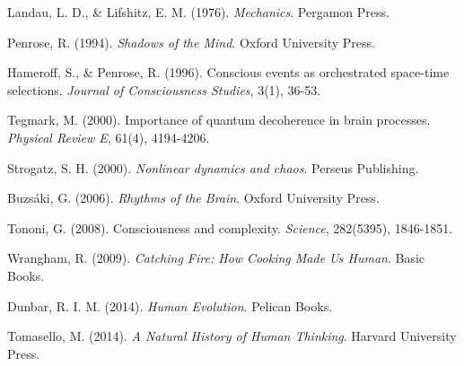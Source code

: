 \documentclass[11pt]{article}
\theoremstyle{remark}
\begin{document}
\begin{thebibliography}{99}

Landau, L. D., \& Lifshitz, E. M. (1976). \textit{Mechanics}. Pergamon Press.

Penrose, R. (1994). \textit{Shadows of the Mind}. Oxford University Press.

Hameroff, S., \& Penrose, R. (1996). Conscious events as orchestrated space-time selections. \textit{Journal of Consciousness Studies}, 3(1), 36-53.

Tegmark, M. (2000). Importance of quantum decoherence in brain processes. \textit{Physical Review E}, 61(4), 4194-4206.

Strogatz, S. H. (2000). \textit{Nonlinear dynamics and chaos}. Perseus Publishing.

Buzsáki, G. (2006). \textit{Rhythms of the Brain}. Oxford University Press.

Tononi, G. (2008). Consciousness and complexity. \textit{Science}, 282(5395), 1846-1851.

Wrangham, R. (2009). \textit{Catching Fire: How Cooking Made Us Human}. Basic Books.

Dunbar, R. I. M. (2014). \textit{Human Evolution}. Pelican Books.

Tomasello, M. (2014). \textit{A Natural History of Human Thinking}. Harvard University Press.

\end{thebibliography}
\end{document}
